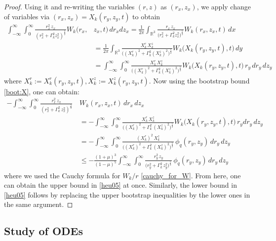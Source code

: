 \documentclass[reqno,11pt]{amsart}
\begin{document}
\begin{proof}
Using it and re-writing the variables $(r,z)$ as $(r_x,z_x)$, we  apply change of variables via $(r_x,z_x) = X_k(r_y, z_y,t)$ to obtain
    \begin{align*}
        \int_{-\infty }^\infty \int_0^\infty  \frac{r^2_x \, z_x}{(r_x^2+\Gamma_k^2z_x^2)^{\frac{5}{2}}} W_k(r_x,&z_x,t) \, dr_x dz_x
    =
        \frac{1}{2\pi}\int_{\mathbb{R}^3} \frac{r_x \, z_x}{\big(r_x^2+\Gamma_k^2z_x^2\big)^{\frac{5}{2}}} W_k(r_x,z_x,t) \, dx
    \\
    &=
        \frac{1}{2\pi}\int_{\mathbb{R}^3} \frac{X^r_k \, X^z_k}{\big((X_k^r)^2+\Gamma_k^2(X_k^z)^2\big)^{\frac{5}{2}}} W_k\big(X_k(r_y,z_y,t),t\big) \, dy
    \\
    &=
         \int_{-\infty}^\infty \int_0^{\infty} \frac{X^r_k \, X^z_k}{\big((X_k^r)^2+\Gamma_k^2(X_k^z)^2\big)^{\frac{5}{2}}} W_k\big(X_k(r_y,z_y,t),t\big) \, r_y \, dr_y \, dz_y
    \end{align*}
where $X_k^r:=X_k^r (r_y, z_y,t), X_k^z:= X_k^z(r_y,z_y,t)$. 
Now using the bootstrap bound \eqref{boot:X}, one can obtain:
    \begin{align*}
    \nonumber 
        -\int_{-\infty}^\infty \int_{0}^\infty 
        \frac{r_x^2 \, z_x }
        {(r_x^2 + \Gamma_k^2 \, z_x^2)^{\frac{5}{2}}} \, 
        & W_k (r_x,z_x,t)
        \, dr_x \, dz_x
    \\
    &=
        -\int_{-\infty}^\infty \int_{0}^\infty
        \frac{X^r_k \, X^z_k}{\big((X^r_k)^2+ \Gamma_k^2 \, (X^z_k)^2\big)^{\frac{5}{2}}} W_k \big(X_k(r_y,z_y,t),t\big) \, r_ydr_y\, dz_y
    \\\nonumber
    &=
        -\int_{-\infty}^\infty \int_{0}^\infty
        \frac{(X^r_k)^2 \, X_k^z}{\big((X^r_k)^2+ \Gamma_k^2 \, (X^z_k)^2 \big)^{\frac{5}{2}}} \,
         \phi_q (r_y,z_y) \, dr_y\,  dz_y
    \\
    &\leq
        -\frac{(1+\mu)^3}{(1-\mu)^5}
        \int_{-\infty}^\infty \int_{0}^\infty
        \frac{r_y^2\, z_y}{\big(r_y^2 + \Gamma_k^2 \, z_y^2\big)^{\frac{5}{2}}} \, \phi_q (r_y,z_y) \, dr _y\, dz_y
    \end{align*}
where we used the Cauchy formula for $W_k/r$ \eqref{cauchy_for_W}. From here, one can obtain the upper bound in \eqref{heu05} at once.
Similarly, the lower bound in \eqref{heu05} follows by replacing the upper bootstrap inequalities by the lower ones in the same argument.
\end{proof}



\subsection{Study of ODEs}
\label{sec:ODEs_Euler}
\end{document}
